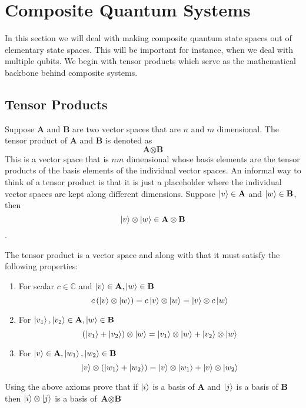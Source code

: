 \section{Composite Quantum Systems}
In this section we will deal with making composite quantum state spaces out of elementary state spaces. This will be important for instance, when we deal with multiple qubits. We begin with tensor products which serve as the mathematical backbone behind composite systems.

\subsection{Tensor Products}
Suppose \textbf{A} and \textbf{B} are two vector spaces that are $n$ and $m$ dimensional. The tensor product of \textbf{A} and \textbf{B} is denoted as 
$$ \textbf{A} \otimes \textbf{B}$$
This is a vector space that is $nm$ dimensional whose basis elements are the tensor products of the basis elements of the individual vector spaces. An informal way to think of a tensor product is that it is just a placeholder where the individual vector spaces are kept along different dimensions. Suppose $\ket{v} \in \textbf{A}$ and $\ket{w} \in \textbf{B}$, then $$\ket{v} \otimes \ket{w} \in \textbf{A} \otimes \textbf{B}$$.

The tensor product is a vector space and along with that it must satisfy the following properties:
\begin{enumerate}
    \item For scalar $c \in \mathbb{C}$ and $\ket{v} \in \textbf{A}, \ket{w} \in \textbf{B}$ $$c \left(\ket{v} \otimes \ket{w}\right) = c\ket{v}\otimes \ket{w} = \ket{v}\otimes c\ket{w}$$
     \item For $\ket{v_1}, \ket{v_2}  \in \textbf{A}, \ket{w} \in \textbf{B}$ $$ \left(\ket{v_1} + \ket{v_2}\right) \otimes \ket{w} = \ket{v_1}\otimes \ket{w} + \ket{v_2}\otimes \ket{w}$$
      \item For $\ket{v}  \in \textbf{A}, \ket{w_1}, \ket{w_2} \in \textbf{B}$ $$ \ket{v}  \otimes \left(\ket{w_1} + \ket{w_2}\right) = \ket{v}\otimes \ket{w_1} + \ket{v}\otimes \ket{w_2}$$
\end{enumerate}

\begin{exercise}
Using the above axioms prove that if $\ket{i}$ is a basis of $\textbf{A}$ and $\ket{j}$ is a basis of $\textbf{B}$ then $\ket{i} \otimes \ket{j}$ is a basis of $\textbf{A} \otimes \textbf{B}$
\end{exercise}

